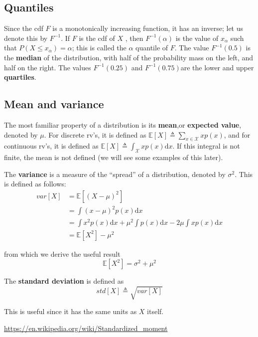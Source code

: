 \documentclass[graybox, envcountchap, twocolumn]{styles/svmult}
\begin{document}
\subsection{Quantiles}
Since the cdf $F$ is a monotonically increasing function, it has an inverse; let us denote this by $F^{-1}$. If $F$ is the cdf of $X$ , then $F^{-1}(\alpha)$ is the value of $x_{\alpha}$ such that $P(X \leq x_{\alpha})=\alpha$; this is called the $\alpha$ quantile of $F$. The value $F^{-1}(0.5)$ is the \textbf{median} of the distribution, with half of the probability mass on the left, and half on the right. The values $F^{-1}(0.25)$ and $F^{−1}(0.75)$are the lower and upper \textbf{quartiles}.

\subsection{Mean and variance}
The most familiar property of a distribution is its \textbf{mean},or \textbf{expected value}, denoted by $\mu$. For discrete rv’s, it is defined as $\mathbb{E}[X] \triangleq \sum_{x \in \mathcal{X}}xp(x)$, and for continuous rv’s, it is defined as $\mathbb{E}[X] \triangleq \int_{\mathcal{X}}xp(x)\mathrm{d}x$. If this integral is not finite, the mean is not defined (we will see some examples of this later). 

The \textbf{variance} is a measure of the “spread” of a distribution, denoted by $\sigma^2$. This is defined as follows:
\begin{align}
var[X]& =\mathbb{E}[(X-\mu)^2] \\
      & =\int{(x-\mu)^2p(x)\mathrm{d}x} \nonumber \\
      & =\int{x^2p(x)\mathrm{d}x}+{\mu}^2\int{p(x)\mathrm{d}x}-2\mu\int{xp(x)\mathrm{d}x} \nonumber \\
	  & =\mathbb{E}[X^2]-{\mu}^2
\end{align}

from which we derive the useful result
\begin{equation}
\mathbb{E}[X^2]=\sigma^2+{\mu}^2
\end{equation}

The \textbf{standard deviation} is defined as
\begin{equation}
std[X] \triangleq \sqrt{var[X]}
\end{equation}

This is useful since it has the same units as $X$ itself.

\url{https://en.wikipedia.org/wiki/Standardized_moment}
\end{document}
